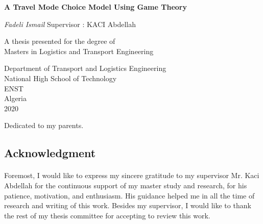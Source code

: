 \documentclass[12pt]{report}
\newenvironment{dedication}
  {\clearpage           %
   \thispagestyle{empty}%
   \vspace*{\stretch{1}}%
   \itshape             %
   \raggedleft          %
  }
  {\par %
   \vspace{\stretch{3}} %
   \clearpage           %
  }
\def\blankpage{%
      \clearpage%
      \thispagestyle{empty}%
      \addtocounter{page}{-1}%
      \null%
      \clearpage}
\begin{document}
\begin{titlepage}

   \begin{center}
   \thisfancypage{%
\setlength{\fboxsep}{10pt}\doublebox}{}
       \vspace*{1cm}
 	   \Huge
       \textbf{A Travel Mode Choice Model Using Game Theory}
		\LARGE
		
       \vspace{0.5cm}
        
            
       \vspace{1.5cm}

       \textit{Fadeli Ismail}
\vfill
\normalsize
Supervisor : KACI Abdellah\\

       \vfill
       
            	\normalsize
       A thesis presented for the degree of\\
       Masters in Logistics and Transport Engineering
            
       \vspace{0.8cm}
     
       
            \Large
       Department of Transport and Logistics Engineering\\
       National High School of Technology \\
       ENST\\
       Algeria\\
       2020
            
   \end{center}
   

\end{titlepage}
\blankpage
\thispagestyle{empty}
\begin{dedication}
Dedicated to my parents.

\end{dedication}



\clearpage
\begin{center}


\section*{Acknowledgment}
\end{center}
\paragraph{}
Foremost, I would like to express my sincere gratitude to my supervisor Mr. Kaci Abdellah for the continuous support of my master study and research, for his patience, motivation, and enthusiasm. His guidance helped me in all the time of research and writing of this work.
Besides my supervisor, I would like to thank the rest of my thesis committee for accepting to review this work.
\end{document}
